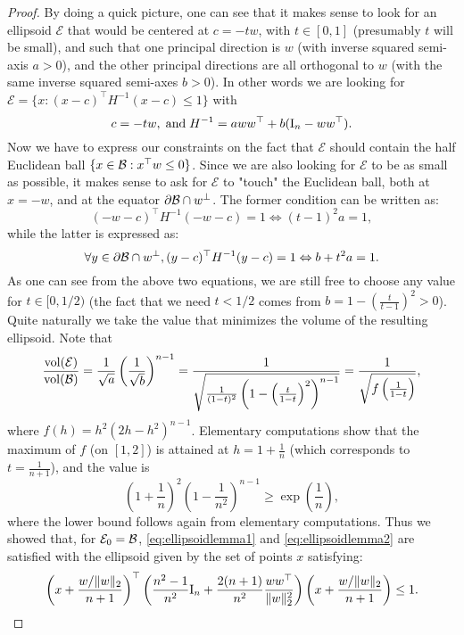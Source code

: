 \begin{proof}
By doing a quick picture, one can see that it makes sense to look for an ellipsoid $\mathcal{E}$ that would be centered at $c= - t w$, with $t \in [0,1]$ (presumably $t$ will be small), and such that one principal direction is $w$ (with inverse squared semi-axis $a>0$), and the other principal directions are all orthogonal to $w$ (with the same inverse squared semi-axes $b>0$). In other words we are looking for $\mathcal{E}= \{x: (x - c)^{\top} H^{-1} (x-c) \leq 1 \}$ with
$$c = - t w, \; \text{and} \; H^{-1} = a w w^{\top} + b (\mathrm{I}_n - w w^{\top} ) .$$
Now we have to express our constraints on the fact that $\mathcal{E}$ should contain the half Euclidean ball $\{x \in \mathcal{B} : x^{\top} w \leq 0\}$. Since we are also looking for $\mathcal{E}$ to be as small as possible, it makes sense to ask for $\mathcal{E}$ to "touch" the Euclidean ball, both at $x = - w$, and at the equator $\partial \mathcal{B} \cap w^{\perp}$. The former condition can be written as:
$$(- w - c)^{\top} H^{-1} (- w - c) = 1 \Leftrightarrow (t-1)^2 a = 1 ,$$
while the latter is expressed as:
$$\forall y \in \partial \mathcal{B} \cap w^{\perp}, (y - c)^{\top} H^{-1} (y - c) = 1 \Leftrightarrow b + t^2 a = 1 .$$
As one can see from the above two equations, we are still free to choose any value for $t \in [0,1/2)$ (the fact that we need $t<1/2$ comes from $b=1 - \left(\frac{t}{t-1}\right)^2>0$). Quite naturally we take the value that minimizes the volume of the resulting ellipsoid. Note that
$$\frac{\mathrm{vol}(\mathcal{E})}{\mathrm{vol}(\mathcal{B})} = \frac{1}{\sqrt{a}} \left(\frac{1}{\sqrt{b}}\right)^{n-1} 
= \frac{1}{\sqrt{\frac{1}{(1-t)^2}\left (1 - \left(\frac{t}{1-t}\right)^2\right)^{n-1}}} \\= \frac{1}{\sqrt{f\left(\frac{1}{1-t}\right)}} ,$$
where $f(h) = h^2 (2 h - h^2)^{n-1}$. Elementary computations show that the maximum of $f$ (on $[1,2]$) is attained at $h = 1+ \frac{1}{n}$ (which corresponds to $t=\frac{1}{n+1}$), and the value is 
$$\left(1+\frac{1}{n}\right)^2 \left(1 - \frac{1}{n^2} \right)^{n-1} \geq \exp \left(\frac{1}{n} \right),$$
where the lower bound follows again from elementary computations. Thus we showed that, for $\mathcal{E}_0 = \mathcal{B}$, \eqref{eq:ellipsoidlemma1} and \eqref{eq:ellipsoidlemma2} are satisfied with the ellipsoid given by the set of points $x$ satisfying:
\begin{equation} \label{eq:ellipsoidlemma5}
\left(x + \frac{w/\|w\|_2}{n+1}\right)^{\top} \left(\frac{n^2-1}{n^2} \mathrm{I}_n + \frac{2(n+1)}{n^2} \frac{w w^{\top}}{\|w\|_2^2} \right) \left(x + \frac{w/\|w\|_2}{n+1} \right) \leq 1 .
\end{equation}



\end{proof}
